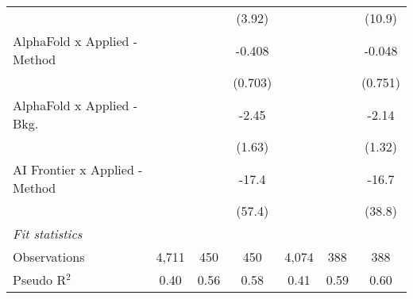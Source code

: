 \begin{tabular}{lcccccc}
                                  &              &         & (3.92)        &              &              & (10.9)\\   
   AlphaFold x Applied - Method   &              &         & -0.408        &              &              & -0.048\\   
                                  &              &         & (0.703)       &              &              & (0.751)\\   
   AlphaFold x Applied - Bkg.     &              &         & -2.45         &              &              & -2.14\\   
                                  &              &         & (1.63)        &              &              & (1.32)\\   
   AI Frontier x Applied - Method &              &         & -17.4         &              &              & -16.7\\   
                                  &              &         & (57.4)        &              &              & (38.8)\\   
   \midrule
   \emph{Fit statistics}\\
   Observations                   & 4,711        & 450     & 450           & 4,074        & 388          & 388\\  
   Pseudo R$^2$                   & 0.40         & 0.56    & 0.58          & 0.41         & 0.59         & 0.60\\  
   

\end{tabular}
